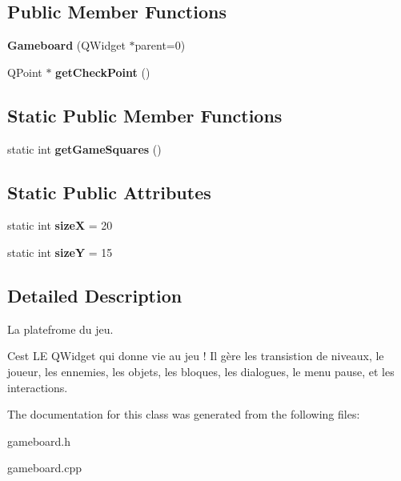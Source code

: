 \subsection*{Public Member Functions}
\begin{DoxyCompactItemize}
\item 
\hypertarget{class_gameboard_a82157069ecfab2d2245b7d5df563aaae}{}{\bfseries Gameboard} (Q\+Widget $\ast$parent=0)\label{class_gameboard_a82157069ecfab2d2245b7d5df563aaae}

\item 
\hypertarget{class_gameboard_a2ae163b581c0ef4aae6bf1ed0ce7965a}{}Q\+Point $\ast$ {\bfseries get\+Check\+Point} ()\label{class_gameboard_a2ae163b581c0ef4aae6bf1ed0ce7965a}

\end{DoxyCompactItemize}
\subsection*{Static Public Member Functions}
\begin{DoxyCompactItemize}
\item 
\hypertarget{class_gameboard_aa10ed162ff321f4fe480e531ef352bd8}{}static int {\bfseries get\+Game\+Squares} ()\label{class_gameboard_aa10ed162ff321f4fe480e531ef352bd8}

\end{DoxyCompactItemize}
\subsection*{Static Public Attributes}
\begin{DoxyCompactItemize}
\item 
\hypertarget{class_gameboard_a50499cde2f942a0d18d261a7103e1e2a}{}static int {\bfseries size\+X} = 20\label{class_gameboard_a50499cde2f942a0d18d261a7103e1e2a}

\item 
\hypertarget{class_gameboard_a1a60c1746c1bfa669b3bf7b3dfc6534d}{}static int {\bfseries size\+Y} = 15\label{class_gameboard_a1a60c1746c1bfa669b3bf7b3dfc6534d}

\end{DoxyCompactItemize}


\subsection{Detailed Description}
La platefrome du jeu. 

C\textquotesingle{}est L\+E Q\+Widget qui donne vie au jeu ! Il gère les transistion de niveaux, le joueur, les ennemies, les objets, les bloques, les dialogues, le menu pause, et les interactions. 

The documentation for this class was generated from the following files\+:\begin{DoxyCompactItemize}
\item 
gameboard.\+h\item 
gameboard.\+cpp\end{DoxyCompactItemize}
